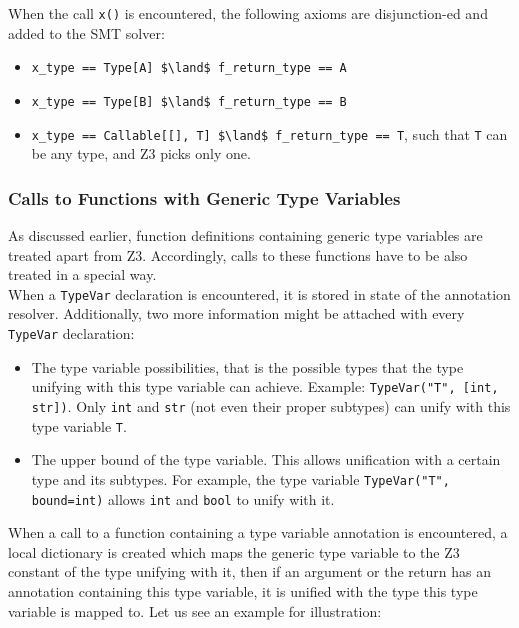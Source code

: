 When the call \lstinline|x()| is encountered, the following axioms are disjunction-ed and added to the SMT solver:

\begin{itemize}
	\item \lstinline[mathescape]|x_type == Type[A] $\land$ f_return_type == A|
	\item \lstinline[mathescape]|x_type == Type[B] $\land$ f_return_type == B|
	\item \lstinline[mathescape]|x_type == Callable[[], T] $\land$ f_return_type == T|, such that \lstinline|T| can be any type, and Z3 picks only one.
\end{itemize}

\subsubsection{Calls to Functions with Generic Type Variables}
As discussed earlier, function definitions containing generic type variables are treated apart from Z3. Accordingly, calls to these functions have to be also treated in a special way.\\

When a \lstinline|TypeVar| declaration is encountered, it is stored in state of the annotation resolver. Additionally, two more information might be attached with every \lstinline|TypeVar| declaration:
\begin{itemize}
	\item The type variable possibilities, that is the possible types that the type unifying with this type variable can achieve. Example: \lstinline|TypeVar("T", [int, str])|. Only \lstinline|int| and \lstinline|str| (not even their proper subtypes) can unify with this type variable \lstinline|T|.
	\item The upper bound of the type variable. This allows unification with a certain type and its subtypes. For example, the type variable \lstinline|TypeVar("T", bound=int)| allows \lstinline|int| and \lstinline|bool| to unify with it.
\end{itemize}

When a call to a function containing a type variable annotation is encountered, a local dictionary is created which maps the generic type variable to the Z3 constant of the type unifying with it, then if an argument or the return has an annotation containing this type variable, it is unified with the type this type variable is mapped to. Let us see an example for illustration:

